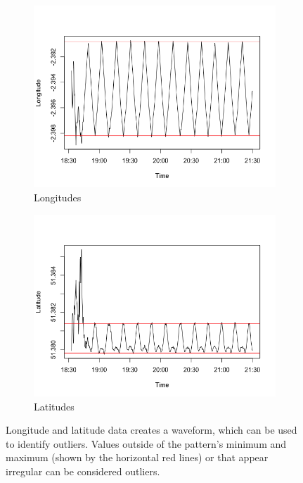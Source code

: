 \documentclass[11pt]{report}
\begin{document}
\begin{figure}[!tb]
    \centering
    \begin{minipage}{1\linewidth}
            \begin{subfigure}[t]{.5\linewidth}
                \includegraphics[width=\textwidth]{images/wave_longitudes}
                \caption{Longitudes}
                \label{fig:wave_longitudes}
            \end{subfigure}
            \begin{subfigure}[t]{.5\linewidth}
            	\includegraphics[width=\textwidth]{images/wave_latitudes}
            	\caption{Latitudes}
            	\label{fig:wave_latitudes}
	   \end{subfigure}
        \end{minipage}
    \caption[Longitude and latitude waveforms.]{Longitude and latitude data creates a waveform, which can be used to identify outliers. Values outside of the pattern's minimum and maximum (shown by the horizontal red lines) or that appear irregular can be considered outliers.}
    \label{fig:waves}
\end{figure}
\end{document}
